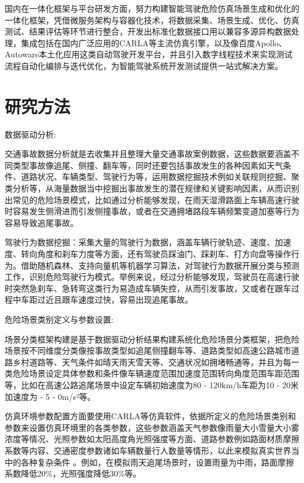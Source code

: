国内在一体化框架与平台研发方面，努力构建智能驾驶危险仿真场景生成和优化的一体化框架，凭借微服务架构与容器化技术，将数据采集、场景生成、优化、仿真测试、结果评估等环节进行整合，开发出标准化数据接口用以兼容多源异构数据处理，集成包括在国内广泛应用的CARLA等主流仿真引擎，以及像百度Apollo、Autoware本土化应用这类自动驾驶开发平台，并且引入数字线程技术来实现测试流程自动化编排与迭代优化\cite{杨学兵2007决策树算法及其核心技术}，为智能驾驶系统开发测试提供一站式解决方案。

\section{研究方法}

数据驱动分析:

交通事故数据分析就是去收集并且整理大量交通事故案例数据，这些数据要涵盖不同类型事故像追尾、侧撞、翻车等，同时还要包括事故发生的各种因素如天气条件、道路状况、车辆类型、驾驶行为等，运用数据挖掘技术例如关联规则挖掘、聚类分析等，从海量数据当中挖掘出事故发生的潜在规律和关键影响因素，从而识别出常见的危险场景模式，比如通过分析能够发现，在雨天湿滑路面上车辆高速行驶时容易发生侧滑进而引发侧撞事故，或者在交通拥堵路段车辆频繁变道加塞等行为容易导致追尾事故\cite{曾星2018基于深度传感器的坐姿检测系统}。

驾驶行为数据挖掘：采集大量的驾驶行为数据，涵盖车辆行驶轨迹、速度、加速度、转向角度和刹车力度等方面，还有驾驶员踩油门、踩刹车、打方向盘等操作行为\cite{吴斌2018基于自然驾驶研究的直行追尾危险场景诱导因素分析}。借助随机森林、支持向量机等机器学习算法，对驾驶行为数据开展分类与预测工作，识别危险驾驶行为模式。举例来说，经过分析能够发现，驾驶员在高速行驶时突然急刹车、急转弯这类行为易造成车辆失控，从而引发事故，又或者在跟车过程中车距过近且跟车速度过快，容易出现追尾事故\cite{程娟2019基于梯度提升决策树的高速公路行程时间预测模型}。

危险场景类别定义与参数设置:

场景分类框架构建是基于数据驱动分析结果构建系统化危险场景分类框架，把危险场景按不同维度分类像按事故类型如追尾侧撞翻车等、道路类型如高速公路城市道路乡村道路等、天气条件如晴天雨天雪天等、交通状况如拥堵畅通等，并且为每一类危险场景设定具体参数和条件像车辆速度范围加速度范围转向角度范围车距范围等，比如在高速公路追尾场景中设定车辆初始速度为80 - 120km/h车距为10 - 20米加速度为 - 5 - 0m/s²等\cite{chen2016xgboost}。

仿真环境参数配置方面要使用CARLA等仿真软件，依据所定义的危险场景类别和参数来设置仿真环境里的各类参数，这些参数涵盖天气参数像雨量大小雪量大小雾浓度等情况、光照参数如太阳高度角光照强度等方面、道路参数例如路面材质摩擦系数等内容、交通密度参数诸如车辆数量行人数量等情形，以此来模拟真实世界当中的各种复杂条件 。例如，在模拟雨天追尾场景时，设置雨量为中雨，路面摩擦系数降低20\%，光照强度降低30\%等。

